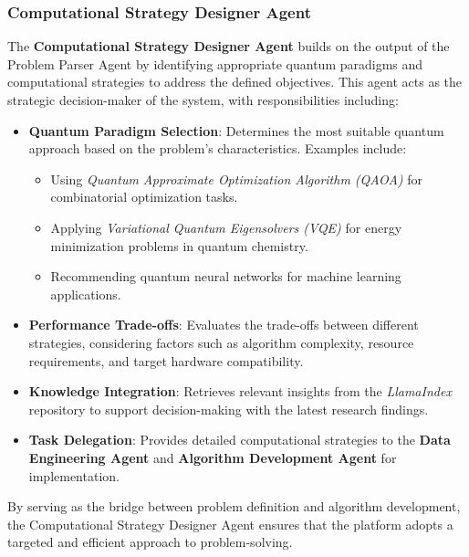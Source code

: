 \documentclass[12pt]{article}
\begin{document}
\subsubsection{Computational Strategy Designer Agent}
The \textbf{Computational Strategy Designer Agent} builds on the output of the Problem Parser Agent by identifying appropriate quantum paradigms and computational strategies to address the defined objectives. This agent acts as the strategic decision-maker of the system, with responsibilities including:
\begin{itemize}
    \item \textbf{Quantum Paradigm Selection}: Determines the most suitable quantum approach based on the problem's characteristics. Examples include:
    \begin{itemize}
        \item Using \textit{Quantum Approximate Optimization Algorithm (QAOA)} for combinatorial optimization tasks.
        \item Applying \textit{Variational Quantum Eigensolvers (VQE)} for energy minimization problems in quantum chemistry.
        \item Recommending quantum neural networks for machine learning applications.
    \end{itemize}
    \item \textbf{Performance Trade-offs}: Evaluates the trade-offs between different strategies, considering factors such as algorithm complexity, resource requirements, and target hardware compatibility.
    \item \textbf{Knowledge Integration}: Retrieves relevant insights from the \textit{LlamaIndex} repository to support decision-making with the latest research findings.
    \item \textbf{Task Delegation}: Provides detailed computational strategies to the \textbf{Data Engineering Agent} and \textbf{Algorithm Development Agent} for implementation.
\end{itemize}
By serving as the bridge between problem definition and algorithm development, the Computational Strategy Designer Agent ensures that the platform adopts a targeted and efficient approach to problem-solving.
\end{document}
